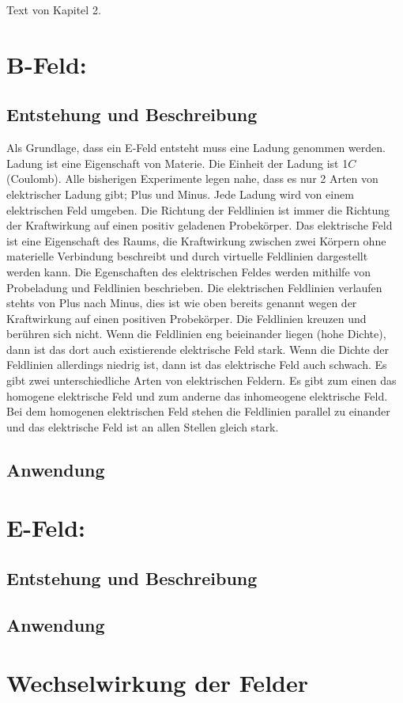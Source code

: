 Text von Kapitel 2.
\section{B-Feld:}
\subsection{Entstehung und Beschreibung}
Als Grundlage, dass ein E-Feld entsteht muss eine Ladung genommen werden. Ladung ist eine Eigenschaft von Materie.
Die Einheit der Ladung ist 1$C$ (Coulomb).
Alle bisherigen Experimente legen nahe, dass es nur 2 Arten von elektrischer Ladung gibt; Plus und Minus.
Jede Ladung wird von einem elektrischen Feld umgeben.
Die Richtung der Feldlinien ist immer die Richtung der Kraftwirkung auf einen positiv geladenen Probekörper.
Das elektrische Feld ist eine Eigenschaft des Raums, die Kraftwirkung zwischen zwei Körpern ohne materielle Verbindung beschreibt und durch virtuelle Feldlinien dargestellt werden kann. 
Die Egenschaften des elektrischen Feldes werden mithilfe von Probeladung und Feldlinien beschrieben.
Die elektrischen Feldlinien verlaufen stehts von Plus nach Minus, dies ist wie oben bereits genannt wegen der Kraftwirkung auf einen positiven Probekörper.
Die Feldlinien kreuzen und berühren sich nicht.
Wenn die Feldlinien eng beieinander liegen (hohe Dichte), dann ist das dort auch existierende elektrische Feld stark.
Wenn die Dichte der Feldlinien allerdings niedrig ist, dann ist das elektrische Feld auch schwach.
Es gibt zwei unterschiedliche Arten von elektrischen Feldern. 
Es gibt zum einen das homogene elektrische Feld und zum anderne das inhomeogene elektrische Feld.
Bei dem homogenen elektrischen Feld stehen die Feldlinien parallel zu einander und das elektrische Feld ist an allen Stellen gleich stark.

\subsection{Anwendung}

\section{E-Feld:}
\subsection{Entstehung und Beschreibung}
\subsection{Anwendung}
\section{Wechselwirkung der Felder}%